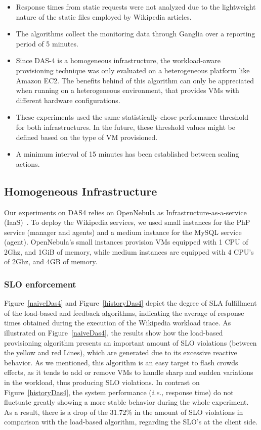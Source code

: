 \begin{itemize}
\item  Response times from static requests were not analyzed due to the lightweight nature of the static files employed by Wikipedia articles. 

\item The algorithms collect the monitoring data through Ganglia over a reporting period of 5 minutes.

\item Since DAS-4 is a homogeneous infrastructure, the workload-aware provisioning technique was only evaluated on a heterogeneous platform like Amazon EC2. The benefits behind of this algorithm can only be appreciated when running on a heterogeneous environment, that provides VMs with different hardware configurations. 

\item These experiments used the same statistically-chose performance threshold for both infrastructures. In the future, these threshold values might be defined based on the type of VM provisioned. 

\item A minimum interval of 15 minutes has been established between scaling actions.
\end{itemize}
\subsection{Homogeneous Infrastructure}

Our experiments on DAS4 relies on OpenNebula as Infrastructure-as-a-service (IaaS)~\cite{sotomayor_virtual_2009}. To deploy the Wikipedia services, we used small instances for the PhP service (manager and agents) and a medium instance for the MySQL service (agent). OpenNebula's small instances provision VMs equipped with 1 CPU of 2Ghz, and 1GiB of memory, while medium instances are equipped with 4 CPU's of 2Ghz, and 4GB of memory.

\subsubsection{SLO enforcement}
Figure~\ref{naiveDas4} and Figure~\ref{historyDas4} depict the degree of SLA fulfillment of the load-based and feedback algorithms, indicating the average of response times obtained during the execution of the Wikipedia workload trace. As illustrated on Figure~\ref{naiveDas4}, the results show how the load-based provisioning algorithm presents an important amount of SLO violations (between the yellow and red Lines), which are generated due to its excessive reactive behavior. As we mentioned, this algorithm is an easy target to flash crowds effects, as it tends to add or remove VMs to handle sharp and sudden variations in the workload, thus producing SLO violations. In contrast on Figure~\ref{historyDas4}, the system performance (\emph{i.e.,} response time) do not fluctuate greatly showing a more stable behavior during the whole experiment. As a result, there is a drop of the 31.72\% in the amount of SLO violations in comparison with the load-based algorithm, regarding the SLO's at the client side. 


